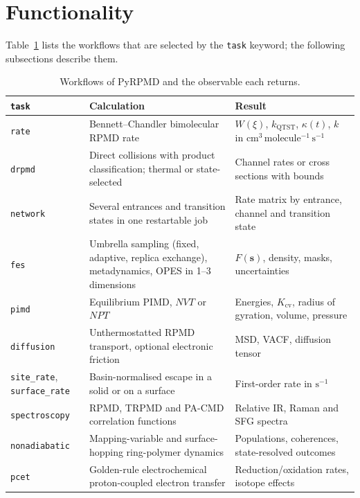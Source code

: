 \documentclass[preprint,12pt]{elsarticle}
\newcommand{\code}[1]{\texttt{#1}}
\newcommand{\rateunit}{\mathrm{cm^{3}\,molecule^{-1}\,s^{-1}}}
\begin{document}
\section{Functionality}
\label{sec:functionality}

Table~\ref{tab:tasks} lists the workflows that are selected by the \code{task} keyword; the following subsections describe them.

\begin{table}[!htbp]
\caption{Workflows of PyRPMD and the observable each returns.}
\label{tab:tasks}
\small
\begin{tabularx}{\textwidth}{@{}l>{\raggedright\arraybackslash}X>{\raggedright\arraybackslash}X@{}}
\toprule
\code{task} & Calculation & Result \\
\midrule
\code{rate} & Bennett--Chandler bimolecular RPMD rate & $W(\xi)$, $k_{\mathrm{QTST}}$, $\kappa(t)$, $k$ in $\rateunit$ \\
\code{drpmd} & Direct collisions with product classification; thermal or state-selected & Channel rates or cross sections with bounds \\
\code{network} & Several entrances and transition states in one restartable job & Rate matrix by entrance, channel and transition state \\
\code{fes} & Umbrella sampling (fixed, adaptive, replica exchange), metadynamics, OPES in 1--3 dimensions & $F(\mathbf s)$, density, masks, uncertainties \\
\code{pimd} & Equilibrium PIMD, $NVT$ or $NPT$ & Energies, $K_{\mathrm{cv}}$, radius of gyration, volume, pressure \\
\code{diffusion} & Unthermostatted RPMD transport, optional electronic friction & MSD, VACF, diffusion tensor \\
\code{site\_rate}, \code{surface\_rate} & Basin-normalised escape in a solid or on a surface & First-order rate in $\mathrm s^{-1}$ \\
\code{spectroscopy} & RPMD, TRPMD and PA-CMD correlation functions & Relative IR, Raman and SFG spectra \\
\code{nonadiabatic} & Mapping-variable and surface-hopping ring-polymer dynamics & Populations, coherences, state-resolved outcomes \\
\code{pcet} & Golden-rule electrochemical proton-coupled electron transfer & Reduction/oxidation rates, isotope effects \\
\bottomrule
\end{tabularx}
\end{table}
\end{document}

